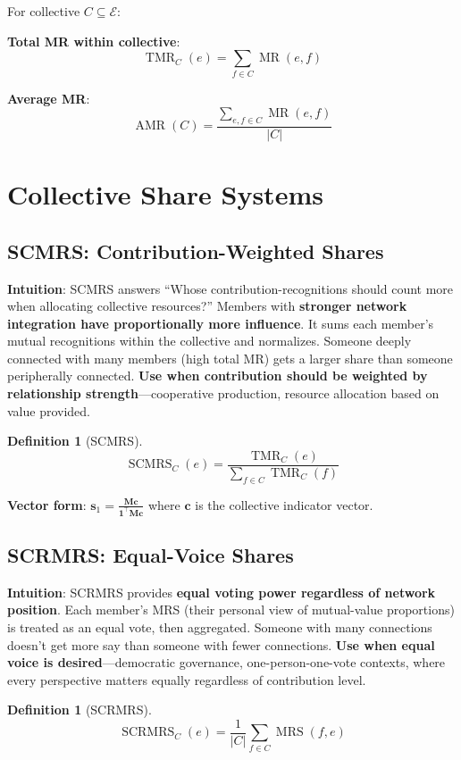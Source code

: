 \documentclass[11pt,a4paper]{article}
\theoremstyle{definition}
\newtheorem{definition}[theorem]{Definition}
\theoremstyle{remark}
\newcommand{\E}{\mathcal{E}}
\DeclareMathOperator{\TMR}{TMR}
\DeclareMathOperator{\MR}{MR}
\DeclareMathOperator{\MRS}{MRS}
\DeclareMathOperator{\SCMRS}{SCMRS}
\DeclareMathOperator{\SCRMRS}{SCRMRS}
\DeclareMathOperator{\AMR}{AMR}
\begin{document}
For collective $C \subseteq \E$:

\textbf{Total MR within collective}:
\[ \TMR_C(e) = \sum_{f \in C} \MR(e,f) \]

\textbf{Average MR}:
\[ \AMR(C) = \frac{\sum_{e,f \in C} \MR(e,f)}{|C|} \]

\section{Collective Share Systems}

\subsection{SCMRS: Contribution-Weighted Shares}

\textbf{Intuition}: SCMRS answers ``Whose contribution-recognitions should count more when allocating collective resources?'' Members with \textbf{stronger network integration have proportionally more influence}. It sums each member's mutual recognitions within the collective and normalizes. Someone deeply connected with many members (high total MR) gets a larger share than someone peripherally connected. \textbf{Use when contribution should be weighted by relationship strength}---cooperative production, resource allocation based on value provided.

\begin{definition}[SCMRS]
\[ \SCMRS_C(e) = \frac{\TMR_C(e)}{\sum_{f \in C} \TMR_C(f)} \]
\end{definition}

\textbf{Vector form}: $\mathbf{s}_1 = \frac{\mathbf{M}\mathbf{c}}{\mathbf{1}^\top \mathbf{M}\mathbf{c}}$ where $\mathbf{c}$ is the collective indicator vector.

\subsection{SCRMRS: Equal-Voice Shares}

\textbf{Intuition}: SCRMRS provides \textbf{equal voting power regardless of network position}. Each member's MRS (their personal view of mutual-value proportions) is treated as an equal vote, then aggregated. Someone with many connections doesn't get more say than someone with fewer connections. \textbf{Use when equal voice is desired}---democratic governance, one-person-one-vote contexts, where every perspective matters equally regardless of contribution level.

\begin{definition}[SCRMRS]
\[ \SCRMRS_C(e) = \frac{1}{|C|} \sum_{f \in C} \MRS(f,e) \]
\end{definition}
\end{document}
